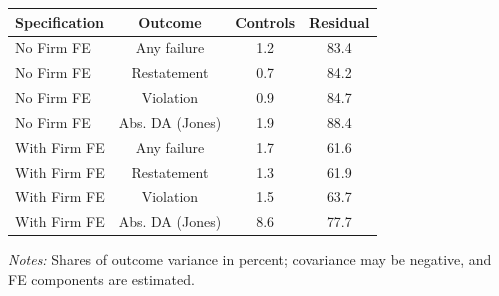 \documentclass[10pt]{article}
\begin{document}
\begin{minipage}{19cm}\fontsize{10}{12}\selectfont\setlength{\tabcolsep}{4pt}\renewcommand{\arraystretch}{1.12}


\centering
{}
\begin{threeparttable}
\begin{tabular}{p{}ccc}
\toprule
Specification & Outcome & Controls & Residual \\
\midrule
No Firm FE & Any failure & 1.2 & 83.4 \\
No Firm FE & Restatement & 0.7 & 84.2 \\
No Firm FE & Violation & 0.9 & 84.7 \\
No Firm FE & Abs. DA (Jones) & 1.9 & 88.4 \\
With Firm FE & Any failure & 1.7 & 61.6 \\
With Firm FE & Restatement & 1.3 & 61.9 \\
With Firm FE & Violation & 1.5 & 63.7 \\
With Firm FE & Abs. DA (Jones) & 8.6 & 77.7 \\
\bottomrule
\end{tabular}
\begin{tablenotes}\fontsize{9}{11}\selectfont
\item \raggedright \fontsize{9}{11}\selectfont \textit{Notes:} Shares of outcome variance in percent; covariance may be negative, and FE components are estimated.
\end{tablenotes}
\end{threeparttable}

\end{minipage}
\end{document}
